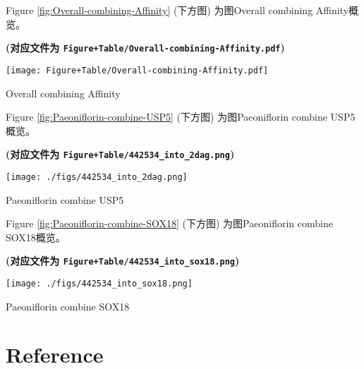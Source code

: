 \documentclass[
]{article}
\begin{document}
Figure \ref{fig:Overall-combining-Affinity} (下方图) 为图Overall combining Affinity概览。

\textbf{(对应文件为 \texttt{Figure+Table/Overall-combining-Affinity.pdf})}

\def\@captype{figure}
\begin{center}
\texttt{[image: Figure+Table/Overall-combining-Affinity.pdf]}
\caption{Overall combining Affinity}\label{fig:Overall-combining-Affinity}
\end{center}

Figure \ref{fig:Paeoniflorin-combine-USP5} (下方图) 为图Paeoniflorin combine USP5概览。

\textbf{(对应文件为 \texttt{Figure+Table/442534\_into\_2dag.png})}

\def\@captype{figure}
\begin{center}
\texttt{[image: ./figs/442534\_into\_2dag.png]}
\caption{Paeoniflorin combine USP5}\label{fig:Paeoniflorin-combine-USP5}
\end{center}

Figure \ref{fig:Paeoniflorin-combine-SOX18} (下方图) 为图Paeoniflorin combine SOX18概览。

\textbf{(对应文件为 \texttt{Figure+Table/442534\_into\_sox18.png})}

\def\@captype{figure}
\begin{center}
\texttt{[image: ./figs/442534\_into\_sox18.png]}
\caption{Paeoniflorin combine SOX18}\label{fig:Paeoniflorin-combine-SOX18}
\end{center}

\hypertarget{bibliography}{%
\section*{Reference}\label{bibliography}}
\end{document}
